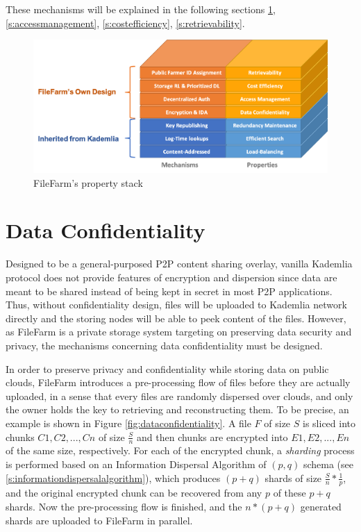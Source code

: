 \noindent These mechanisms will be explained in the following sections \ref{s:dataconfidentiality}, \ref{s:accessmanagement}, \ref{s:costefficiency}, \ref{s:retrievability}.

\begin{figure}[hbt]
\centering
  \includegraphics[width=14cm]{figures/property_stack.png}
  \caption{FileFarm's property stack}
  \label{fig:propertystack}
\end{figure}

\section{Data Confidentiality}
\label{s:dataconfidentiality}

Designed to be a general-purposed P2P content sharing overlay, vanilla Kademlia protocol does not provide features of encryption and dispersion since data are meant to be shared instead of being kept in secret in most P2P applications. Thus, without confidentiality design, files will be uploaded to Kademlia network directly and the storing nodes will be able to peek content of the files. However, as FileFarm is a private storage system targeting on preserving data security and privacy, the mechanisms concerning data confidentiality must be designed.

In order to preserve privacy and confidentiality while storing data on public clouds, FileFarm introduces a pre-processing flow of files before they are actually uploaded, in a sense that every files are randomly dispersed over clouds, and only the owner holds the key to retrieving and reconstructing them. To be precise, an example is shown in Figure \ref{fig:dataconfidentiality}. A file $F$ of size $S$ is sliced into chunks $C1, C2, ..., Cn$ of size $\frac{S}{n}$ and then chunks are encrypted into $E1, E2, ..., En$ of the same size, respectively. For each of the encrypted chunk, a \textit{sharding} process is performed based on an Information Dispersal Algorithm of $(p,q)$ schema (see \ref{s:informationdispersalalgorithm}), which produces $(p + q)$ shards of size $\frac{S}{n}*\frac{1}{p}$, and the original encrypted chunk can be recovered from any $p$ of these $p + q$ shards. Now the pre-processing flow is finished, and the $n * (p + q)$ generated shards are uploaded to FileFarm in parallel.


